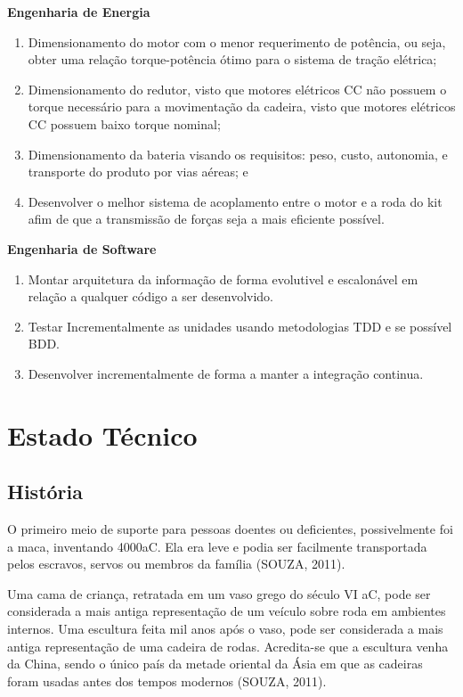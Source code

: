 \textbf{Engenharia de Energia}
  \begin{enumerate}
    \item Dimensionamento do motor com o menor requerimento de potência, ou seja, obter uma relação torque-potência ótimo para o sistema de tração elétrica;
    \item Dimensionamento do redutor, visto que motores elétricos CC não possuem o torque necessário para a movimentação da cadeira, visto que motores elétricos CC possuem baixo torque nominal;
    \item Dimensionamento da bateria visando os requisitos: peso, custo, autonomia, e transporte do produto por vias aéreas; e
    \item Desenvolver o melhor sistema de acoplamento entre o motor e a roda do kit afim de que a transmissão de forças seja a mais eficiente possível.
  \end{enumerate}

\textbf{Engenharia de Software}
  \begin{enumerate}
    \item Montar arquitetura da informação de forma evolutivel e escalonável em relação a qualquer código a ser desenvolvido.
    \item Testar Incrementalmente as unidades usando metodologias TDD e se possível BDD.
    \item Desenvolver incrementalmente de forma a manter a integração continua.
  \end{enumerate}

\section{Estado Técnico}

\subsection{História}
O primeiro meio de suporte para pessoas doentes ou deficientes, possivelmente foi a maca, inventando 4000aC. Ela era leve e podia ser facilmente transportada pelos escravos, servos ou membros da família (SOUZA, 2011).

Uma cama de criança, retratada em um vaso grego do século VI aC, pode ser considerada a mais antiga representação de um veículo sobre roda em ambientes internos. Uma escultura feita mil anos após o vaso, pode ser considerada a mais antiga representação de uma cadeira de rodas. Acredita-se que a escultura venha da China, sendo o único país da metade oriental da Ásia em que as cadeiras foram usadas antes dos tempos modernos (SOUZA, 2011).

